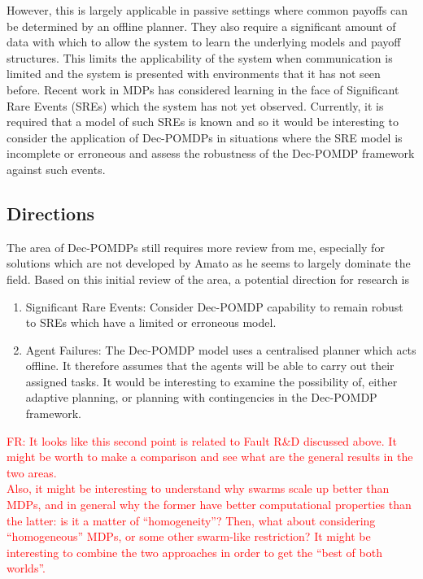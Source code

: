 \documentclass[preprint,11pt]{report}
\newcommand\fr[1]{\textcolor{red}{FR: #1}}
\begin{document}
However, this is largely applicable in passive settings where common
payoffs can be determined by an offline planner. They also require a
significant amount of data with which to allow the system to learn the
underlying models and payoff structures. This limits the applicability
of the system when communication is limited and the system is
presented with environments that it has not seen before.  Recent work
in MDPs \cite{Klima2019RobustDomains} has considered learning in the
face of Significant Rare Events (SREs) which the system has not yet
observed. Currently, it is required that a model of such SREs is known
and so it would be interesting to consider the application of
Dec-POMDPs in situations where the SRE model is incomplete or
erroneous and assess the robustness of the Dec-POMDP framework against
such events.

\subsection{Directions}

The area of Dec-POMDPs still requires more review from me, especially for solutions which are not
developed by Amato as he seems to largely dominate the field. Based on this initial review of the
area, a potential direction for research is

\begin{enumerate} \item Significant Rare Events: Consider Dec-POMDP capability to remain robust to
  SREs which have a limited or erroneous model.


\item Agent Failures: The Dec-POMDP model uses a
centralised planner which acts offline. It therefore assumes that the agents will be able to carry
out their assigned tasks. It would be interesting to examine the possibility of, either adaptive
planning, or planning with contingencies in the Dec-POMDP framework. \end{enumerate}

\fr{It looks like this second point is related to Fault R\&D discussed above. It might be worth to make a comparison and see what are the general results in the two areas.\\
Also, it might be interesting to understand why swarms scale up better
than MDPs, and in general why the former have better computational
properties than the latter: is it a matter of
``homogeneity''? Then, what about considering ``homogeneous'' MDPs, or
some other swarm-like restriction? It might be interesting to combine
the two approaches in order to get the ``best of both worlds''.}
\end{document}
